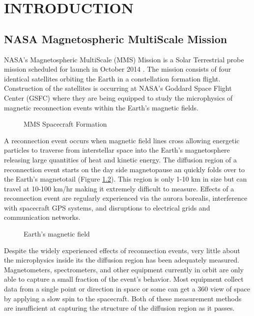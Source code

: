 

\chapter{INTRODUCTION}
\label{chap:Introduction}

\section{NASA Magnetospheric MultiScale Mission}
\label{sec:NASAMagnetosphericMultiScaleMission}

NASA's Magnetospheric MultiScale (MMS) Mission is a Solar Terrestrial probe mission scheduled for launch in October 2014 \cite{mms_website}.  The mission consists of four identical satellites orbiting the Earth in a constellation formation flight.  Construction of the satellites is occurring at NASA's Goddard Space Flight Center (GSFC) where they are being equipped to study the microphysics of magnetic reconnection events within the Earth's magnetic fields.

\begin{figure}[H]
\centerline{}
\caption{MMS Spacecraft Formation}
\label{fig:spacecraft_formation}
\end{figure}

A reconnection event occurs when magnetic field lines cross allowing energetic particles to traverse from interstellar space into the Earth's magnetosphere releasing large quantities of heat and kinetic energy.  The diffusion region of a reconnection event starts on the day side magnetopause an quickly folds over to the Earth's magnetotail (Figure \ref{fig:magneticfields}).  This region is only 1-10 km in size but can travel at 10-100 km/hr \cite{swri} making it extremely difficult to measure.  Effects of a reconnection event are regularly experienced via the aurora borealis, interference with spacecraft GPS systems, and disruptions to electrical grids and communication networks.

\begin{figure}[H]
\centerline{}
\caption{Earth's magnetic field}
\label{fig:magneticfields}
\end{figure}

Despite the widely experienced effects of reconnection events, very little about the microphysics inside its the diffusion region has been adequately measured.  Magnetometers, spectrometers, and other equipment currently in orbit are only able to capture a small fraction of the event's behavior.  Most equipment collect data from a single point or direction in space or some can get a 360 view of space by applying a slow spin to the spacecraft.  Both of these measurement methods are insufficient at capturing the structure of the diffusion region as it passes.

